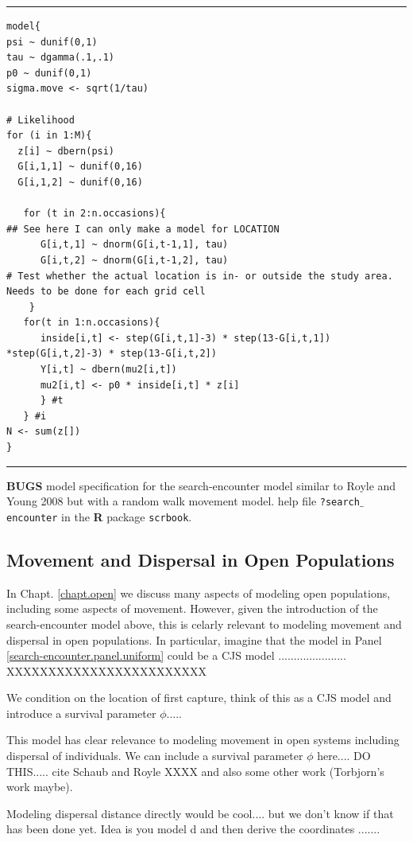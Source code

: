\begin{panel}[htp]
\centering
\rule[0.15in]{\textwidth}{.03in}
{\small
\begin{verbatim}
model{
psi ~ dunif(0,1)
tau ~ dgamma(.1,.1)
p0 ~ dunif(0,1)
sigma.move <- sqrt(1/tau)

# Likelihood 
for (i in 1:M){
  z[i] ~ dbern(psi)
  G[i,1,1] ~ dunif(0,16)
  G[i,1,2] ~ dunif(0,16)

   for (t in 2:n.occasions){
## See here I can only make a model for LOCATION
      G[i,t,1] ~ dnorm(G[i,t-1,1], tau)
      G[i,t,2] ~ dnorm(G[i,t-1,2], tau)
# Test whether the actual location is in- or outside the study area. Needs to be done for each grid cell
    }
   for(t in 1:n.occasions){ 
      inside[i,t] <- step(G[i,t,1]-3) * step(13-G[i,t,1]) *step(G[i,t,2]-3) * step(13-G[i,t,2])
      Y[i,t] ~ dbern(mu2[i,t])
      mu2[i,t] <- p0 * inside[i,t] * z[i]
      } #t
   } #i
N <- sum(z[])
}
\end{verbatim}
}
\rule[-0.15in]{\textwidth}{.03in}
\caption{
{\bf BUGS} model specification for the search-encounter model similar
to Royle and Young 2008 but with a random walk movement model. 
help file \mbox{\tt ?search$\_$encounter} in the {\bf R} package \mbox{\tt scrbook}.
}
\label{search-encounter.panel.uniform}
\end{panel}

\subsection{Movement and Dispersal in Open Populations}

In Chapt. \ref{chapt.open} we discuss many aspects of modeling open
populations, including some aspects of movement. However, given the
introduction of the search-encounter model above, this is celarly
relevant to modeling movement and dispersal in open populations.
In particular, imagine that the model in Panel
\ref{search-encounter.panel.uniform} could be a CJS model ......................
XXXXXXXXXXXXXXXXXXXXXXXX

We condition on the location of first capture, think of this as a CJS
model and introduce a survival parameter $\phi$.....

This model has clear relevance to modeling movement in open systems
including dispersal of individuals. We can include a survival
parameter $\phi$ here.... DO THIS..... cite Schaub and Royle XXXX and
also some other work (Torbjorn's work maybe). 

Modeling dispersal distance directly would be cool.... but we don't
know if that has been done yet.
Idea is you model d and then derive the coordinates .......

